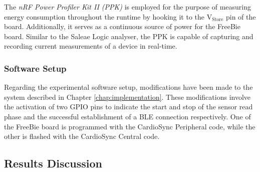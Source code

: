 \noindent The \textit{nRF Power Profiler Kit II (PPK)} \cite{2023Power} is employed for the purpose of measuring energy consumption throughout the runtime by hooking it to the \(\text{V}_\text{Store}\) pin of the board. Additionally, it serves as a continuous source of power for the FreeBie board. Similar to the Saleae Logic analyser, the PPK is capable of capturing and recording current measurements of a device in real-time.

\subsubsection{Software Setup}
Regarding the experimental software setup, modifications have been made to the system described in Chapter \ref{chap:implementation}. These modifications involve the activation of two GPIO pins to indicate the start and stop of the sensor read phase and the successful establishment of a BLE connection respectively. One of the FreeBie board is programmed with the CardioSync Peripheral code, while the other is flashed with the CardioSync Central code.

\subsection{Results Discussion}

